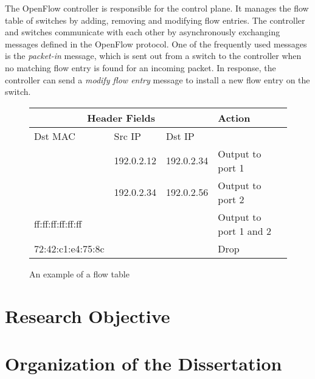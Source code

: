 The OpenFlow controller is responsible for the control plane. It manages
the flow table of switches by adding, removing and modifying flow
entries. The controller and switches communicate with each other by
asynchronously exchanging messages defined in the OpenFlow protocol. One
of the frequently used messages is the \emph{packet-in} message, which
is sent out from a switch to the controller when no matching flow entry
is found for an incoming packet. In response, the controller can send a
\emph{modify flow entry} message to install a new flow entry on the
switch.

\begin{figure}
    \centering
    \begin{tabular}{lllll}
        \toprule
        \multicolumn{3}{c}{Header Fields}            &  Action                  \\ \midrule
        Dst MAC           & Src IP     & Dst IP      &                          \\ \midrule
                          & 192.0.2.12 & 192.0.2.34  & Output to port 1         \\
                          & 192.0.2.34 & 192.0.2.56  & Output to port 2         \\
        ff:ff:ff:ff:ff:ff &            &             & Output to port 1 and 2   \\
        72:42:c1:e4:75:8c &            &             & Drop                     \\
        \bottomrule
    \end{tabular}
    \caption{An example of a flow table}%
    \label{tbl:flow-table}
\end{figure}

\section{Research Objective}



\section{Organization of the Dissertation}

